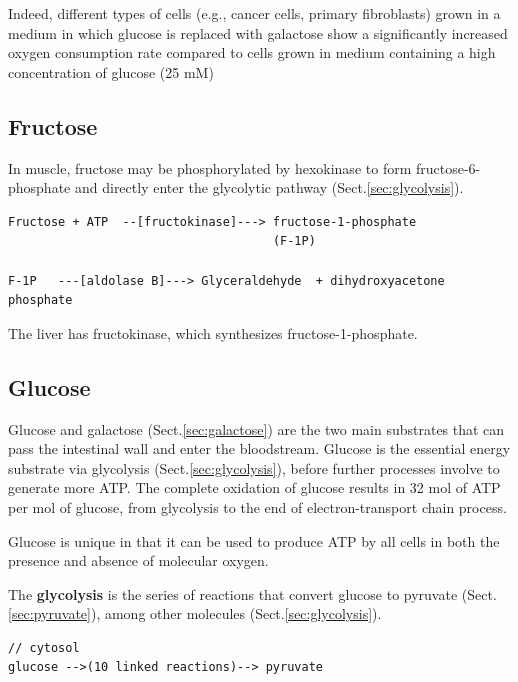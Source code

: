 Indeed, different types of cells (e.g., cancer cells, primary fibroblasts) grown
in a medium in which glucose is replaced with galactose show a significantly
increased oxygen consumption rate compared to cells grown in medium containing a
high concentration of glucose (25 mM)



\subsection{Fructose}
\label{sec:fructose}

In muscle, fructose may be phosphorylated by hexokinase to form
fructose-6-phosphate and directly enter the glycolytic pathway
(Sect.\ref{sec:glycolysis}).

{\tiny
\begin{verbatim}
Fructose + ATP  --[fructokinase]---> fructose-1-phosphate 
                                     (F-1P)

F-1P   ---[aldolase B]---> Glyceraldehyde  + dihydroxyacetone phosphate
\end{verbatim}
}

The liver has fructokinase, which synthesizes fructose-1-phosphate.


\subsection{Glucose}
\label{sec:glucose}

Glucose and galactose (Sect.\ref{sec:galactose}) are the two main substrates
that can pass the intestinal wall and enter the bloodstream.
Glucose is the essential energy substrate via glycolysis
(Sect.\ref{sec:glycolysis}), before further processes involve to generate more
ATP. The complete oxidation of glucose results in 32 mol of ATP per mol of
glucose, from glycolysis to the end of electron-transport chain process.

Glucose is unique in that it can be used to produce ATP by all cells in both the
presence and absence of molecular oxygen.

The {\bf glycolysis} is the series of reactions that convert glucose to pyruvate
(Sect.\ref{sec:pyruvate}), among other molecules (Sect.\ref{sec:glycolysis}).
\begin{verbatim}
// cytosol
glucose -->(10 linked reactions)--> pyruvate
\end{verbatim}


